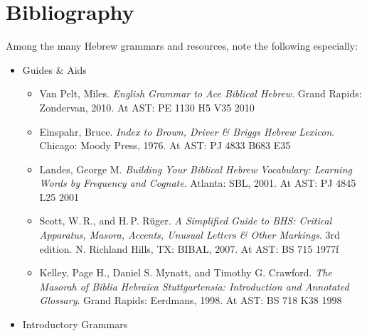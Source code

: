 \documentclass[titlepage]{article}
\newcommand\policy{../policy}
\begin{document}




\section{Bibliography}
\label{bib}

Among the many Hebrew grammars and resources, note the following
especially:

\begin{itemize}
  \item Guides \& Aids

    \begin{itemize}
      \item
        Van Pelt, Miles. \emph{English Grammar to Ace Biblical Hebrew}.
        Grand Rapids: Zondervan, 2010. At AST: PE 1130 H5 V35 2010
      \item
        Einspahr, Bruce. \emph{Index to Brown, Driver \& Briggs Hebrew Lexicon}.
        Chicago: Moody Press, 1976. At AST: PJ 4833 B683 E35
      \item
        Landes, George M. \emph{Building Your Biblical Hebrew
        Vocabulary: Learning Words by Frequency and Cognate}.
        Atlanta: SBL, 2001. At AST: PJ 4845 L25 2001
      \item
        Scott, W.\,R., and H.\,P. Rüger. \emph{A Simplified Guide to BHS:
        Critical Apparatus, Masora, Accents, Unusual Letters \& Other
        Markings}. 3rd edition. N. Richland Hills, TX: BIBAL, 2007.
        At AST: BS 715 1977f
      \item
        Kelley, Page H., Daniel S. Mynatt, and Timothy G. Crawford.
        \emph{The Masorah of Biblia Hebraica Stuttgartensia:
        Introduction and Annotated Glossary}.
        Grand Rapids: Eerdmans, 1998. At AST: BS 718 K38 1998
    \end{itemize}

  \item Introductory Grammars


\end{itemize}
\end{document}
